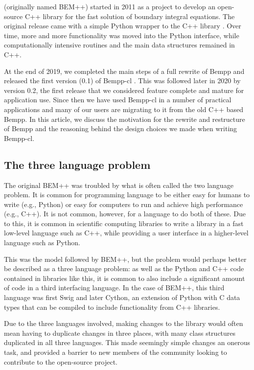  (originally named BEM++) started in 2011 as a project to develop an open-source C++ library for the fast solution of boundary integral equations. The original release came with a simple Python wrapper to the C++ library \cite{bempp_orig}. Over time, more and more functionality was moved into the Python interface, while computationally intensive routines and the main data structures remained in C++.

At the end of 2019, we completed the main steps of a full rewrite of Bempp and released the first version (0.1) of Bempp-cl \cite{Bempp-cl}. This was followed later in 2020 by version 0.2, the first release that we considered feature complete and mature for application use. Since then we have used Bempp-cl in a number of practical applications and many of our users are migrating to it from the old C++ based Bempp. In this article, we discuss the motivation for the rewrite and restructure of Bempp and the reasoning behind the design choices we made when writing Bempp-cl.

\subsection{The three language problem}
The original BEM++ was troubled by what is often called the two language problem. It is common for programming language to be either easy for humans to write (e.g., Python) or easy for computers to run and achieve high performance (e.g., C++). It is not common, however, for a language to do both of these. Due to this, it is common in scientific computing libraries to write a library in a fast low-level language such as C++, while providing a user interface in a higher-level language such as Python.

This was the model followed by BEM++, but the problem would perhaps better be described as a three language problem: as well as the Python and C++ code contained in libraries like this, it is common to also include a significant amount of code in a third interfacing language. In the case of BEM++, this third language was first Swig and later Cython, an extension of Python with C data types that can be compiled to include functionality from C++ libraries.

Due to the three languages involved, making changes to the library would often mean having to duplicate changes in three places, with many class structures duplicated in all three languages. This made seemingly simple changes an onerous task, and provided a barrier to new members of the community looking to contribute to the open-source project.

